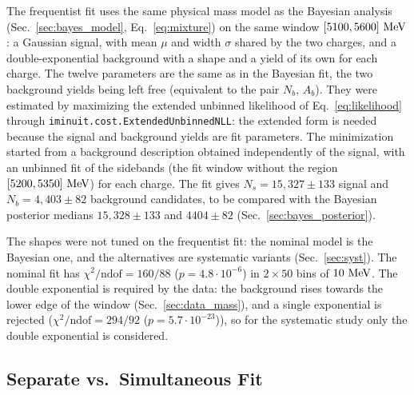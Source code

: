 The frequentist fit uses the same physical mass model as the Bayesian analysis (Sec.~\ref{sec:bayes_model}, Eq.~\eqref{eq:mixture}) on the same window $[5100,5600]\,\,\text{Me\hspace{-.08em}V}$: a Gaussian signal, with mean $\mu$ and width $\sigma$ shared by the two charges, and a double-exponential background with a shape and a yield of its own for each charge. The twelve parameters are the same as in the Bayesian fit, the two background yields being left free (equivalent to the pair $N_b$, $A_b$). They were estimated by maximizing the extended unbinned likelihood of Eq.~\eqref{eq:likelihood} through \texttt{iminuit.cost.ExtendedUnbinnedNLL}: the extended form is needed because the signal and background yields are fit parameters. The minimization started from a background description obtained independently of the signal, with an unbinned fit of the sidebands (the fit window without the region $[5200,5350]\,\,\text{Me\hspace{-.08em}V}$) for each charge. The fit gives $N_s=15{,}327\pm133$ signal and $N_b=4{,}403\pm82$ background candidates, to be compared with the Bayesian posterior medians $15{,}328\pm133$ and $4404\pm82$ (Sec.~\ref{sec:bayes_posterior}).

The shapes were not tuned on the frequentist fit: the nominal model is the Bayesian one, and the alternatives are systematic variants (Sec.~\ref{sec:syst}). The nominal fit has $\chi^2/\mathrm{ndof}=160/88$ ($p=4.8\cdot 10^{-6}$) in $2\times50$ bins of $10\,\,\text{Me\hspace{-.08em}V}$.
The double exponential is required by the data: the background rises towards the lower edge of the window (Sec.~\ref{sec:data_mass}), and a single exponential is rejected ($\chi^2/\mathrm{ndof}=294/92$ ($p=5.7\cdot 10^{-23}$)), so for the systematic study only the double exponential is considered.

\subsection{Separate vs.\ Simultaneous Fit}
\label{sec:freq_simfit}

